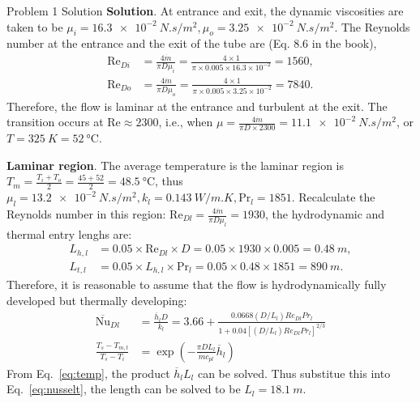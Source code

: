 \documentclass[9pt, aspectratio=169, handout]{beamer}
\begin{document}
\begin{frame}[allowframebreaks]{Problem 1 Solution}
    \textbf{Solution}. At entrance and exit, the dynamic viscosities are taken to be $\mu_i = \SI{16.3e-2}{N.s/m^2}, \mu_o = \SI{3.25e-2}{N.s/m^2}$. The Reynolds number at the entrance and the exit of the tube are (Eq. 8.6 in the book),
    \begin{align}
        \mathrm{Re}_{Di} &= \frac{4\dot{m}}{\pi D \mu_i} = \frac{4 \times 1}{\pi \times 0.005 \times 16.3 \times 10^{-2}} = 1560, \\
        \mathrm{Re}_{Do} &= \frac{4\dot{m}}{\pi D \mu_o} = \frac{4 \times 1}{\pi \times 0.005 \times 3.25 \times 10^{-2}} = 7840.
    \end{align}
    Therefore, the flow is laminar at the entrance and turbulent at the exit. The transition occurs at $\mathrm{Re} \approx 2300$, i.e., when $\mu=\frac{4\dot{m}}{\pi D \times 2300} = \SI{11.1e-2}{N.s/m^2}$, or $T=\SI{325}{K}=\SI{52}{\celsius}$.
    
    \textbf{Laminar region}. The average temperature is the laminar region is $T_m = \frac{T_i+T_o}{2} = \frac{45+52}{2} = \SI{48.5}{\celsius}$, thus $\mu_{l} = \SI{13.2e-2}{N.s/m^2}, k_l = \SI{0.143}{W/m.K}, \mathrm{Pr}_l = 1851$. Recalculate the Reynolds number in this region: $\mathrm{Re}_{Dl} = \frac{4\dot{m}}{\pi D \mu_l} = 1930$, the hydrodynamic and thermal entry lenghs are:
    \begin{align}
        L_{h,l} &= 0.05 \times \mathrm{Re}_{Dl} \times D = 0.05 \times 1930 \times 0.005 = \SI{0.48}{m}, \\
        L_{t,l} &= 0.05 \times L_{h,l} \times \mathrm{Pr}_l = 0.05 \times 0.48 \times 1851 = \SI{890}{m}.
    \end{align}
    Therefore, it is reasonable to assume that the flow is hydrodynamically fully developed but thermally developing:
    \begin{align}
        \overline{\mathrm{Nu}}_{Dl} &= \frac{\overline{h}_l D}{k_l} = 3.66 + \frac{0.0668 (D/L_l) Re_{Dl}Pr_{l}}{1 + 0.04 [(D/L_l) Re_{Dl}Pr_{l}]^{2/3}} \label{eq:nusselt}\\
        \frac{T_s - T_{m, t}}{T_s - T_i} &= \exp\left( -\frac{\pi D L_l}{\dot{m} c_{pl}}\overline{h}_l \right) \label{eq:temp}
    \end{align}
    From Eq.~\eqref{eq:temp}, the product $\overline{h}_l L_l$ can be solved. Thus substitue this into Eq.~\eqref{eq:nusselt}, the length can be solved to be $L_l = \SI{18.1}{m}$.

    \framebreak


\end{frame}
\end{document}
